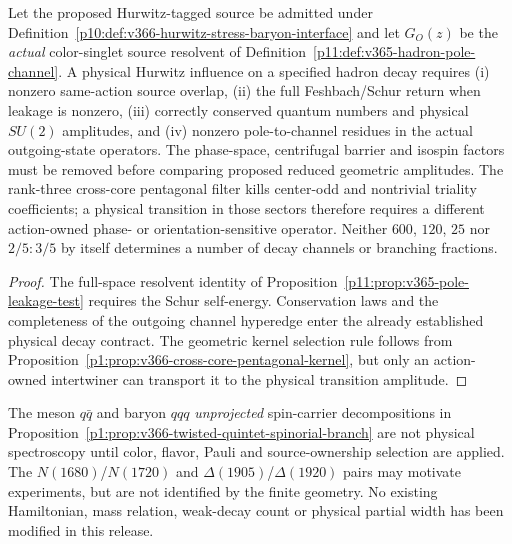 \documentclass[12pt,a4paper]{article}
\begin{document}
\begin{proposition}
\label{p11:prop:v366-hurwitz-decay-residue-gate}
Let the proposed Hurwitz-tagged source be admitted under
Definition~\ref{p10:def:v366-hurwitz-stress-baryon-interface} and
let $G_O(z)$ be the \emph{actual} color-singlet source resolvent of
Definition~\ref{p11:def:v365-hadron-pole-channel}.  A physical
Hurwitz influence on a specified hadron decay requires (i) nonzero
same-action source overlap, (ii) the full Feshbach/Schur return
when leakage is nonzero, (iii) correctly conserved quantum numbers
and physical $SU(2)$ amplitudes, and (iv) nonzero pole-to-channel
residues in the actual outgoing-state operators.  The phase-space,
centrifugal barrier and isospin factors must be removed before
comparing proposed reduced geometric amplitudes.
The rank-three cross-core pentagonal filter kills center-odd and
nontrivial triality coefficients; a physical transition in those
sectors therefore requires a different action-owned phase- or
orientation-sensitive operator.  Neither $600$, $120$, $25$ nor
$2/5:3/5$ by itself determines a number of decay channels or
branching fractions.
\end{proposition}
\begin{proof}
The full-space resolvent identity of
Proposition~\ref{p11:prop:v365-pole-leakage-test}
requires the Schur self-energy.  Conservation laws and the
completeness of the outgoing channel hyperedge enter the already
established physical decay contract.  The geometric kernel
selection rule follows from
Proposition~\ref{p1:prop:v366-cross-core-pentagonal-kernel},
but only an action-owned intertwiner can transport it to the
physical transition amplitude.
\end{proof}

\begin{remark}
\label{p11:rem:v366-decay-physical-frontier}
The meson $q\bar q$ and baryon $qqq$ \emph{unprojected}
spin-carrier decompositions in
Proposition~\ref{p1:prop:v366-twisted-quintet-spinorial-branch}
are not physical spectroscopy until color, flavor, Pauli and
source-ownership selection are applied.  The $N(1680)$/$N(1720)$
and $\Delta(1905)$/$\Delta(1920)$ pairs may motivate experiments,
but are not identified by the finite geometry.  No existing
Hamiltonian, mass relation, weak-decay count or physical partial
width has been modified in this release.
\end{remark}
\end{document}
